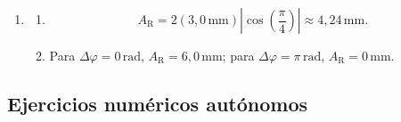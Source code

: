 \begin{enumerate}[label=\textbf{G\arabic*.},leftmargin=*]
    \item
    \begin{enumerate}[label=\alph*)]
        \item
        \[
            A_\mathrm{R}
              =2(3{,}0\,\text{mm})
               \left|\cos\left(\frac{\pi}{4}\right)\right|
              \approx4{,}24\,\text{mm}.
        \]
        \item Para \(\Delta\varphi=0\,\text{rad}\),
        \(A_\mathrm{R}=6{,}0\,\text{mm}\); para
        \(\Delta\varphi=\pi\,\text{rad}\), \(A_\mathrm{R}=0\,\text{mm}\).
    \end{enumerate}
\end{enumerate}

\subsection*{Ejercicios numéricos autónomos}

